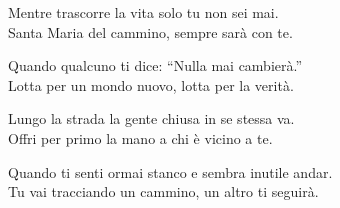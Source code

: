 
\strofa Mentre trascorre la vita solo tu non sei mai.\\
Santa Maria del cammino, sempre sarà con te.

\spazio


\spazio

\strofa Quando qualcuno ti dice: ``Nulla mai cambierà.''\\
Lotta per un mondo nuovo, lotta per la verità.

\spazio


\spazio

\strofa Lungo la strada la gente chiusa in se stessa va.\\
Offri per primo la mano a chi è vicino a te.

\spazio


\spazio

\strofa Quando ti senti ormai stanco e sembra inutile andar.\\
Tu vai tracciando un cammino, un altro ti seguirà.

\spazio

